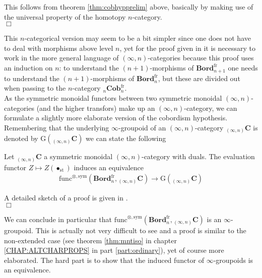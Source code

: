 \begin{prf}[Sketch]
This follows from theorem \ref{thm:cobhypprelim} above, basically by making use of the universal property of the homotopy $n$-category.
\\
\phantom{proven}
\hfill
$\Box$
\end{prf}
This $n$-categorical version may seem to be a bit simpler since one does not have to deal with morphisms above level $n$, yet for the proof given in \cite{dfcdc48c} it is necessary to work in the more general language of $(\infty,n)$-categories because this proof uses an induction on $n$: to understand the $(n+1)$-morphisms of $\mathbf{Bord}_{n+1}^{\mathrm{fr}}$ one needs to understand the $(n+1)$-morphisms of $\mathbf{Bord}_{n}^{\mathrm{fr}}$, but these are {\glqq}divided out{\grqq} when passing to the $n$-category ${_{n}}\mathbf{Cob}_{n}^{\mathrm{fr}}$.
\\
As the symmetric monoidal functors between two symmetric monoidal $(\infty,n)$-categories (and the higher transfors) make up an $(\infty,n)$-category, we can formulate a slightly more elaborate version of the cobordism hypothesis. Remembering that the underlying $\infty$-groupoid of an $(\infty,n)$-category ${_{(\infty,n)}}\mathbf{C}$ is denoted by $\mathrm{G}({_{(\infty,n)}}\mathbf{C})$ we can state the following
\\
\begin{thm}
\label{thm:cobhypframed}
Let ${_{(\infty,n)}}\mathbf{C}$ a symmetric monoidal $(\infty,n)$-category with duals. The evaluation functor $Z \mapsto Z(\bullet_{\mathrm{st}})$ induces an equivalence
\begin{align*}
  \mathrm{func}^{\otimes,\mathrm{sym}}
  \left(
    \mathbf{Bord}_{n}^{\mathrm{fr}}
    ,
    {_{(\infty,n)}}\mathbf{C}
  \right)
  \to
  \mathrm{G}({_{(\infty,n)}}\mathbf{C})
\end{align*}
\end{thm}
\begin{prf}
A detailed sketch of a proof is given in \cite{dfcdc48c}.
\\
\phantom{proven}
\hfill
$\Box$
\end{prf}
We can conclude in particular that $\mathrm{func}^{\otimes,\mathrm{sym}}(\mathbf{Bord}_{n}^{\mathrm{fr}},{_{(\infty,n)}}\mathbf{C})$ is an $\infty$-groupoid. This is actually not very difficult to see and a proof is similar to the non-extended case (see theorem \ref{thm:mntiso} in chapter \ref{CHAP:ALTCHARPROPS} in part \ref{part:ordinary}), yet of course more elaborated. The hard part is to show that the induced functor of $\infty$-groupoids is an equivalence.
